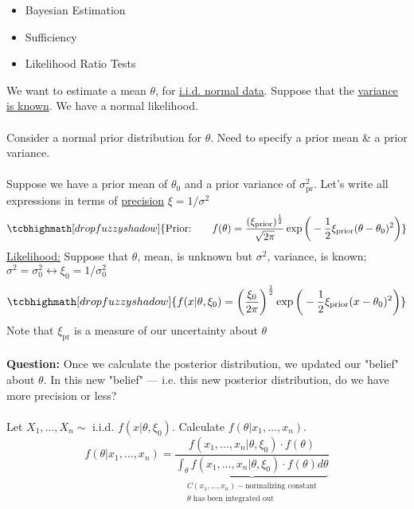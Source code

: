 \begin{itemize}
	\item Bayesian Estimation
	\item Sufficiency
	\item Likelihood Ratio Tests
\end{itemize}
We want to estimate a mean $\theta$, for \underline{i.i.d. normal data}. Suppose that the \underline{variance is known}. We have a normal likelihood. \\\\
Consider a normal prior distribution for $\theta$. Need to specify a prior mean \& a prior variance.\\\\
Suppose we have a prior mean of $\theta_0$ and a prior variance of $\sigma_{\text{pr}}^2$. Let's write all expressions in terms of \underline{precision} $\xi = 1/\sigma^2$
\begin{gather*}
	\tcbhighmath[drop fuzzy shadow]{\text{Prior:} \qquad f(\theta) = \frac{(\xi_{\text{prior}})^{\frac{1}{2}}}{\sqrt{2\pi}} \exp \bigg( -\frac{1}{2} \xi_{\text{prior}} (\theta - \theta_0)^2 \bigg)}
\end{gather*}
\underline{Likelihood:} Suppose that $\theta$, mean, is unknown but $\sigma^2$, variance, is known; $\sigma^2 = \sigma^2_0 \longleftrightarrow \xi_0 = 1/\sigma_0^2$
\begin{equation*}
	\tcbhighmath[drop fuzzy shadow]{f(x | \theta, \xi_0) = \bigg(\frac{\xi_0}{2\pi} \bigg)^{\frac{1}{2}} \exp\bigg( -\frac{1}{2} \xi_{\text{prior}} (x - \theta_0)^2 \bigg)}
\end{equation*}
Note that $\xi_{\text{pr}}$ is a measure of our uncertainty about $\theta$\\\\
\textbf{Question:} Once we calculate the posterior distribution, we updated our "belief" about $\theta$. In this new "belief" — i.e. this new posterior distribution, do we have more precision or less?\\\\
Let $X_1, \ldots, X_n \sim$ i.i.d. $f(x | \theta, \xi_0)$. Calculate $f(\theta | x_1, \ldots, x_n)$.
\begin{equation*}
	f(\theta | x_1, \ldots, x_n) = \frac{f(x_1, \ldots, x_n | \theta, \xi_0) \cdot f(\theta)}{\underbrace{\int_\theta f(x_1, \ldots, x_n | \theta, \xi_0) \cdot f(\theta) d\theta}_{\substack{C(x_1, \ldots, x_n) - \text{normalizing constant} \\ \theta \text{ has been integrated out}}}}
\end{equation*}
